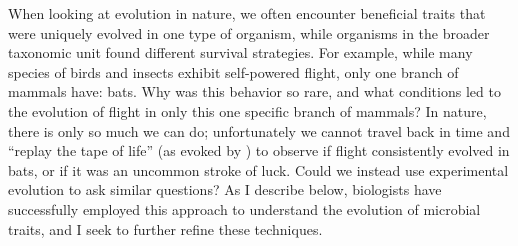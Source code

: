 When looking at evolution in nature, we often encounter beneficial traits that were uniquely evolved in one type of organism, while organisms in the broader taxonomic unit found different survival strategies. %
For example, while many species of birds and insects exhibit self-powered flight, only one branch of mammals have: bats. 
Why was this behavior so rare, and what conditions led to the evolution of flight in only this one specific branch of mammals? 
In nature, there is only so much we can do; unfortunately we cannot travel back in time and ``replay the tape of life'' (as evoked by \citet{gouldWonderfulLifeBurgess1990}) to observe if flight consistently evolved in bats, or if it was an uncommon stroke of luck.
Could we instead use experimental evolution to ask similar questions?
As I describe below, biologists have successfully employed this approach to understand the evolution of microbial traits, and I seek to further refine these techniques.

